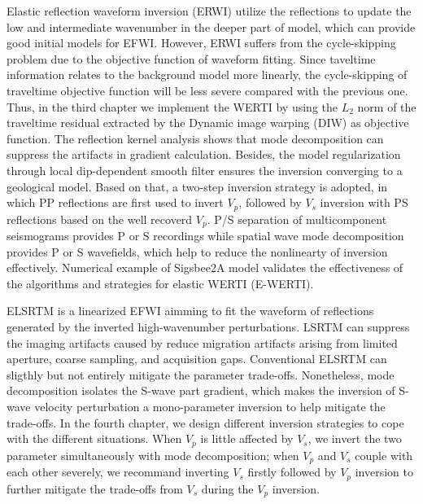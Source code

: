 \begin{eabstract}
Elastic reflection waveform inversion (ERWI) utilize the reflections to update the low and
intermediate wavenumber in the
deeper part of model, which can provide good initial models for EFWI. However, ERWI suffers from
the cycle-skipping problem due to the objective function of waveform fitting. Since taveltime
information relates to the background model more linearly, the cycle-skipping of traveltime
objective function will be less severe
compared with the previous one. Thus, in the third chapter we implement the WERTI by using the $L_2$ norm of the traveltime
residual extracted by the Dynamic image warping (DIW) as objective function.
The reflection kernel analysis shows that mode decomposition can suppress the artifacts in
gradient calculation. 
Besides, the model regularization through local dip-dependent smooth filter ensures the inversion converging to a
geological model. 
Based on that, a two-step inversion strategy is adopted, in which PP reflections are first used to invert $V_p$,
followed by $V_s$ inversion with PS reflections based on the well recoverd $V_p$. P/S
separation of multicomponent seismograms provides P or S recordings while spatial wave mode
decomposition provides P or S wavefields, which help
to  reduce the nonlinearty of inversion effectively.
Numerical example of Sigsbee2A model validates the effectiveness of the
algorithms and strategies for elastic WERTI (E-WERTI).

ELSRTM is a linearized EFWI aimming to fit the waveform of reflections generated by the inverted
high-wavenumber perturbations. 
LSRTM can suppress the imaging artifacts caused by reduce migration artifacts arising
from limited aperture, coarse sampling, and acquisition gaps. Conventional ELSRTM can sligthly but
not entirely mitigate the parameter trade-offs. 
Nonetheless, mode decomposition
isolates the S-wave part gradient, which makes the inversion of S-wave velocity
perturbation a mono-parameter inversion to help mitigate the trade-offs. In the fourth chapter, we
design different inversion strategies to cope with the different situations. When $V_p$ is little
affected by $V_s$, we invert the two parameter simultaneously with mode decomposition; when $V_p$
and $V_s$ couple with each
other severely, we recommand inverting $V_s$ firstly followed by $V_p$ inversion to further mitigate
the trade-offs from $V_s$ during the $V_p$ inversion.


\end{eabstract}
